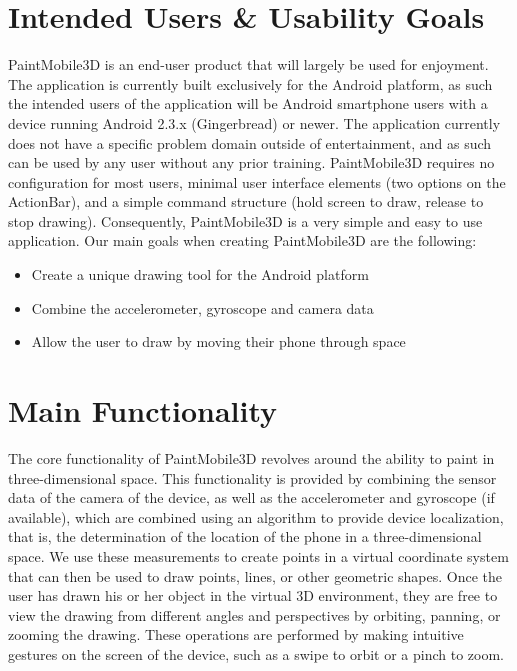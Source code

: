 \documentclass{chi-ext}
\begin{document}
\pagebreak

\section{Intended Users \& Usability Goals}

PaintMobile3D is an end-user product that will largely be used for enjoyment.
The application is currently built exclusively for the Android platform, as
such the intended users of the application will be Android smartphone users
with a device running Android 2.3.x (Gingerbread) or newer. The application
currently does not have a specific problem domain outside of entertainment,
and as such can be used by any user without any prior training. PaintMobile3D
requires no configuration for most users, minimal user interface elements (two
options on the ActionBar), and a simple command structure (hold screen to
draw, release to stop drawing). Consequently, PaintMobile3D is a very simple
and easy to use application. Our main goals when creating PaintMobile3D are
the following:

\begin{itemize} \item Create a unique drawing tool for the Android platform
\item Combine the accelerometer, gyroscope and camera data \item Allow the
user to draw by moving their phone through space \end{itemize}

\section{Main Functionality}

The core functionality of PaintMobile3D revolves around the ability to paint
in three-dimensional space. This functionality is provided by combining the
sensor data of the camera of the device, as well as the accelerometer and
gyroscope (if available), which are combined using an algorithm to provide
device localization, that is, the determination of the location of the phone
in a three-dimensional space. We use these measurements to create points in a
virtual coordinate system that can then be used to draw points, lines, or
other geometric shapes. Once the user has drawn his or her object in the
virtual 3D environment, they are free to view the drawing from different
angles and perspectives by orbiting, panning, or zooming the drawing. These
operations are performed by making intuitive gestures on the screen of the
device, such as a swipe to orbit or a pinch to zoom.
\end{document}

